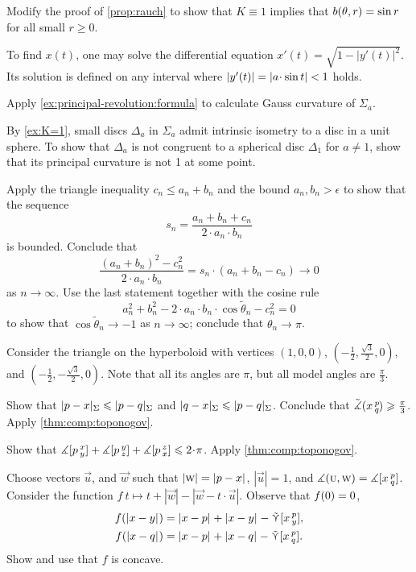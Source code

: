 \begin{multicols}{2}
 Modify the proof of \ref{prop:rauch} to show that $K\equiv 1$ implies that $b(\theta,r)\z=\sin r$ for all small $r\ge 0$.



To find $x(t)$, one may solve the differential equation
$x'(t)=\sqrt{1-|y'(t)|^2}$.
Its solution is defined on any interval where $|y'(t)|\z=|a\cdot \sin t|<1$ holds.

Apply \ref{ex:principal-revolution:formula} to calculate Gauss curvature of $\Sigma_a$.

By \ref{ex:K=1}, small discs $\Delta_a$ in $\Sigma_a$ admit intrinsic isometry to a disc in a unit sphere.
To show that $\Delta_a$ is not congruent to a spherical disc $\Delta_1$ for $a\ne 1$, show that its principal curvature is not 1 at some point. 


\setcounter{eqtn}{0}

Apply the triangle inequality $c_n\le a_n+b_n$ and the bound $a_n,b_n>\epsilon$ to show that the sequence 
\[s_n=\frac{a_n+b_n+c_n}{2\cdot a_n\cdot b_n}\]
is bounded.
Conclude that 
\[\frac{(a_n+b_n)^2-c_n^2}{2\cdot a_n\cdot b_n}=s_n\cdot (a_n+b_n-c_n)\to 0\]
as $n\to\infty$.
Use the last statement together with the cosine rule
\[a_n^2+b_n^2-2\cdot a_n\cdot b_n\cdot\cos\tilde\theta_n -c_n^2=0\]
to show that $\cos\tilde\theta_n\to -1$ as $n\to\infty$;
conclude that $\theta_n\to \pi$.

Consider the triangle on the hyperboloid with vertices $(1,0,0)$, $(-\tfrac{1}2, \tfrac{\sqrt{3} }2, 0)$, and $(-\tfrac{1}2, -\tfrac{\sqrt{3} }2, 0)$.
Note that all its angles are $\pi$, but all model angles are $\tfrac{\pi}3$.

Show that $\dist{p}{x}\Sigma\le \dist{p}{q}\Sigma$ and $\dist{q}{x}\Sigma\le \dist{p}{q}\Sigma$.
Conclude that $\tilde\measuredangle(x\,{}^{p}_{q}\hspace{-0.2ex})\geqslant \tfrac\pi3$.
Apply \ref{thm:comp:toponogov}.

Show that 
$\measuredangle\hinge pxy+\measuredangle\hinge pyz+\measuredangle\hinge pzx\le2\cdot \pi$.
Apply \ref{thm:comp:toponogov}.

Choose vectors $\vec u$, and $\vec w$ 
such that $|\vec w|\z=\dist{p}{x}{}$, $|\vec u|=1$, and $\measuredangle(\text{\sc{u}},\text{\sc{w}})=\measuredangle[x\,{}^{p}_{q}]$.
Consider the function
$f\:t\mapsto t+|\vec w|-|\vec w-t\cdot \vec u|$.
Observe that $f(0)\z=0$,
\begin{align*}
f(\dist{x}{y}{})&=\dist{x}{p}{}+\dist{x}{y}{}-\side\hinge xpy,
\\
f(\dist{x}{q}{})&=\dist{x}{p}{}+\dist{x}{q}{}-\side\hinge xpq.
\end{align*}
Show and use that $f$ is concave.


\end{multicols}
